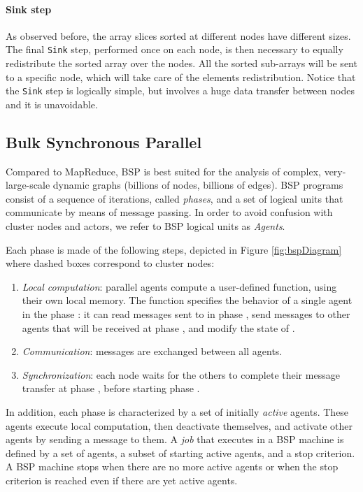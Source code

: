 \documentclass[a4paper]{article}
\numberwithin{equation}{section}
\begin{document}
\paragraph{Sink step}
As observed before, the array slices sorted at different nodes have
different sizes. The final \verb+Sink+ step, performed once on each
node, is then necessary to equally redistribute the sorted array over
the nodes. All the sorted sub-arrays will be sent to a specific node,
which will take care of the elements redistribution.
Notice that the \verb+Sink+ step is logically simple, but involves a
huge data transfer between nodes and it is unavoidable.

\subsection{Bulk Synchronous Parallel}
\label{subsec:BSP}

Compared to MapReduce, BSP is best suited for the analysis of complex,
very-large-scale dynamic graphs (billions of nodes, billions of
edges). 
BSP programs consist of a sequence of iterations, called
\textit{phases}, and a set of logical units that communicate by means
of message passing. 
In order to avoid confusion with cluster nodes and actors, 
we refer to BSP logical units as \textit{Agents}.

Each phase  is made of the following steps, 
depicted in Figure \ref{fig:bspDiagram} where dashed boxes
correspond to cluster nodes:
\begin{enumerate}
\item \emph{Local computation}: parallel agents compute a user-defined
  function, using their own 
  local memory. The function specifies the behavior of a single agent
   in the phase : it can read messages sent to  in
  phase , send messages to other agents that will be received at
  phase , and modify the state of . 
\item \emph{Communication}: messages are exchanged between all
  agents.
\item \emph{Synchronization}: each node waits for the others to
  complete their message transfer at phase , before starting phase
  .
\end{enumerate}

In addition, each phase is characterized by a set of initially
\emph{active} agents. These agents execute local computation, then
deactivate themselves, and activate other agents by sending a
message to them. 
A \emph{job} that executes in a BSP machine is defined by a set of
agents, a subset of starting active agents, and a stop criterion. 
A BSP machine stops when there are no more active agents or when the
stop criterion is reached even if there are yet active agents.
\end{document}
